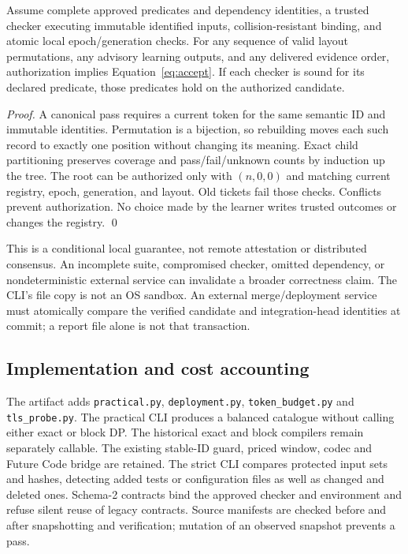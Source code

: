 \begin{theorem}\label{thm:soundness}
Assume complete approved predicates and dependency identities, a trusted checker
executing immutable identified inputs, collision-resistant binding, and atomic
local epoch/generation checks. For any sequence of valid layout permutations,
any advisory learning outputs, and any delivered evidence order, authorization
implies Equation~\eqref{eq:accept}. If each checker is sound for its declared
predicate, those predicates hold on the authorized candidate.
\end{theorem}
\begin{proof}
A canonical pass requires a current token for the same semantic ID and immutable
identities. Permutation is a bijection, so rebuilding moves each such record to
exactly one position without changing its meaning. Exact child partitioning
preserves coverage and pass/fail/unknown counts by induction up the tree. The
root can be authorized only with $(n,0,0)$ and matching current registry, epoch,
generation, and layout. Old tickets fail those checks. Conflicts prevent
authorization. No choice made by the learner writes trusted outcomes or changes
the registry. \qed
\end{proof}
This is a conditional local guarantee, not remote attestation or distributed
consensus. An incomplete suite, compromised checker, omitted dependency, or
nondeterministic external service can invalidate a broader correctness claim. The
CLI's file copy is not an OS sandbox. An external merge/deployment service must
atomically compare the verified candidate and integration-head identities at
commit; a report file alone is not that transaction.

\subsection{Implementation and cost accounting}\label{sec:impl}
The artifact adds \texttt{practical.py}, \texttt{deployment.py},
\texttt{token\_budget.py} and \texttt{tls\_probe.py}. The practical CLI produces
a balanced catalogue without calling either exact or block DP. The historical
exact and block compilers remain separately callable. The existing stable-ID
guard, priced window, codec and Future Code bridge are retained. The strict CLI
compares protected input sets and hashes, detecting added tests or configuration
files as well as changed and deleted ones. Schema-2 contracts bind the approved
checker and environment and refuse silent reuse of legacy contracts. Source
manifests are checked before and after snapshotting and verification; mutation
of an observed snapshot prevents a pass.

